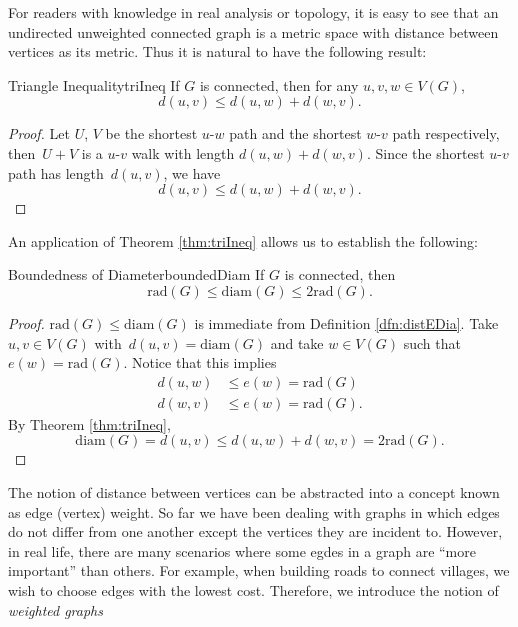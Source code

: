\documentclass[math]{amznotes}
\theoremstyle{remark}
\newcommand{\0}{\mathbf{0}}
\newcommand{\1}{\mathbf{1}}
\begin{document}
For readers with knowledge in real analysis or topology, it is easy to see that an undirected unweighted connected graph is a metric space with distance between vertices as its metric. Thus it is natural to have the following result:
\begin{thmbox}{Triangle Inequality}{triIneq}
    If $G$ is connected, then for any $u, v, w \in V(G)$,
    \begin{equation*}
        d(u, v) \leq d(u, w) + d(w, v).
    \end{equation*}
    \tcblower   
    \begin{proof}
        Let $U$, $V$ be the shortest $u$-$w$ path and the shortest $w$-$v$ path respectively, then~$U + V$ is a $u$-$v$ walk with length $d(u, w) + d(w, v)$. Since the shortest $u$-$v$ path has length~$d(u, v)$, we have
        \begin{equation*}
            d(u, v) \leq d(u, w) + d(w, v).
        \end{equation*}
    \end{proof}
\end{thmbox}
An application of Theorem \ref{thm:triIneq} allows us to establish the following:
\begin{thmbox}{Boundedness of Diameter}{boundedDiam}
    If $G$ is connected, then
    \begin{equation*}
        \mathrm{rad}(G) \leq \mathrm{diam}(G) \leq 2\mathrm{rad}(G).
    \end{equation*}
    \tcblower
    \begin{proof}
        $\mathrm{rad}(G) \leq \mathrm{diam}(G)$ is immediate from Definition \ref{dfn:distEDia}. Take $u, v \in V(G)$ with~$d(u, v) = \mathrm{diam}(G)$ and take $w \in V(G)$ such that $e(w) = \mathrm{rad}(G)$. Notice that this implies
        \begin{align*}
            d(u, w) & \leq e(w) = \mathrm{rad}(G) \\
            d(w, v) & \leq e(w) = \mathrm{rad}(G).
        \end{align*}
        By Theorem \ref{thm:triIneq}, 
        \begin{equation*}
            \mathrm{diam}(G) = d(u, v) \leq d(u, w) + d(w, v) = 2\mathrm{rad}(G).
        \end{equation*}
    \end{proof}
\end{thmbox}
The notion of distance between vertices can be abstracted into a concept known as edge (vertex) weight. So far we have been dealing with graphs in which edges do not differ from one another except the vertices they are incident to. However, in real life, there are many scenarios where some egdes in a graph are ``more important'' than others. For example, when building roads to connect villages, we wish to choose edges with the lowest cost. Therefore, we introduce the notion of \textit{weighted graphs}
\end{document}
